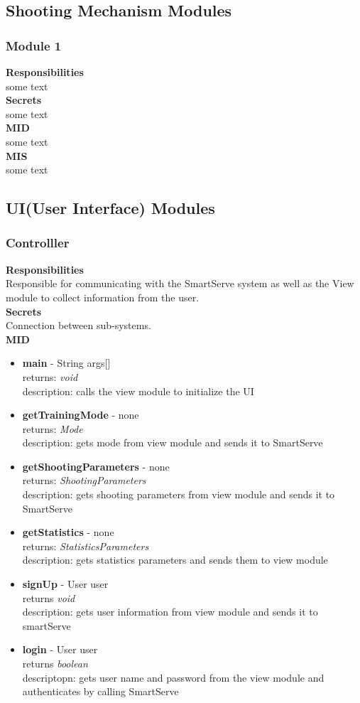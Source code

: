 \documentclass[11pt]{article}
\begin{document}
\subsection{Shooting Mechanism Modules}
\subsubsection*{Module 1}
\textbf{Responsibilities} \\
some text \\
\textbf{Secrets} \\ 
some text \\ 
\textbf{MID} \\
some text \\
\textbf{MIS} \\
some text \\
\subsection{UI(User Interface) Modules}
\subsubsection*{Controlller}
\textbf{Responsibilities} \\
Responsible for communicating with the SmartServe system as well as the View module to collect information from the user. \\
\textbf{Secrets} \\ 
Connection between sub-systems. \\ 
\textbf{MID} \\
\begin{itemize}
\item \textbf{main} - String args[] \\ returns: \textit{void} \\ description: calls the view module to initialize the UI
\item \textbf{getTrainingMode} - none \\ returns: \textit{Mode} \\ description: gets mode from view module and sends it to SmartServe
\item \textbf{getShootingParameters} - none \\ returns: \textit{ShootingParameters} \\ description: gets shooting parameters from view module and sends it to SmartServe
\item \textbf{getStatistics} - none \\ returns: \textit{StatisticsParameters} \\ description: gets statistics parameters and sends them to view module
\item \textbf{signUp} - User user \\ returns \textit{void} \\ description: gets user information from view module and sends it to smartServe
\item \textbf{login} - User user \\ returns \textit{boolean} \\ descriptopn: gets user name and password from the view module and authenticates by calling SmartServe
\end{itemize}
\end{document}
